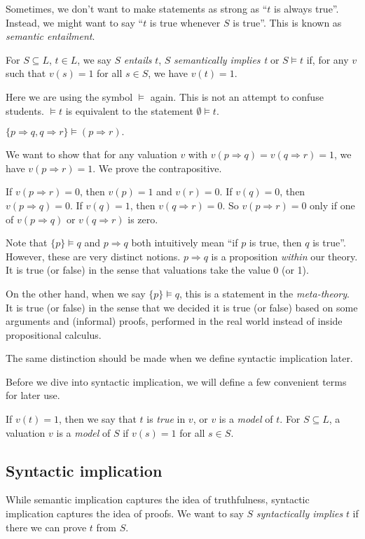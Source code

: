 \documentclass[a4paper]{article}
\begin{document}
Sometimes, we don't want to make statements as strong as ``$t$ is always true''. Instead, we might want to say ``$t$ is true whenever $S$ is true''. This is known as \emph{semantic entailment}.
\begin{defi}
  For $S\subseteq L$, $t\in L$, we say $S$ \emph{entails} $t$, $S$ \emph{semantically implies t} or $S\models t$ if, for any $v$ such that $v(s) = 1$ for all $s\in S$, we have $v(t) = 1$.
\end{defi}
Here we are using the symbol $\models$ again. This is not an attempt to confuse students. $\models t$ is equivalent to the statement $\emptyset \models t$.

\begin{eg}
  $\{p\Rightarrow q, q\Rightarrow r\}\models (p\Rightarrow r).$

  We want to show that for any valuation $v$ with $v(p\Rightarrow q) = v(q\Rightarrow r) = 1$, we have $v(p\Rightarrow r) = 1$. We prove the contrapositive.

  If $v(p\Rightarrow r) = 0$, then $v(p) = 1$ and $v(r) = 0$. If $v(q) = 0$, then $v(p\Rightarrow q) = 0$. If $v(q) = 1$, then $v(q\Rightarrow r) = 0$. So $v(p\Rightarrow r) = 0$ only if one of $v(p\Rightarrow q)$ or $v(q\Rightarrow r)$ is zero.
\end{eg}

Note that $\{p\}\models q$ and $p \Rightarrow q$ both intuitively mean ``if $p$ is true, then $q$ is true''. However, these are very distinct notions. $p\Rightarrow q$ is a proposition \emph{within} our theory. It is true (or false) in the sense that valuations take the value 0 (or 1).

On the other hand, when we say $\{p\} \models q$, this is a statement in the \emph{meta-theory}. It is true (or false) in the sense that we decided it is true (or false) based on some arguments and (informal) proofs, performed in the real world instead of inside propositional calculus.

The same distinction should be made when we define syntactic implication later.

Before we dive into syntactic implication, we will define a few convenient terms for later use.
\begin{defi}
  If $v(t) = 1$, then we say that $t$ is \emph{true} in $v$, or $v$ is a \emph{model} of $t$. For $S\subseteq L$, a valuation $v$ is a \emph{model} of $S$ if $v(s) = 1$ for all $s\in S$.
\end{defi}
\subsection{Syntactic implication}
While semantic implication captures the idea of truthfulness, syntactic implication captures the idea of proofs. We want to say $S$ \emph{syntactically implies} $t$ if there we can prove $t$ from $S$.
\end{document}
